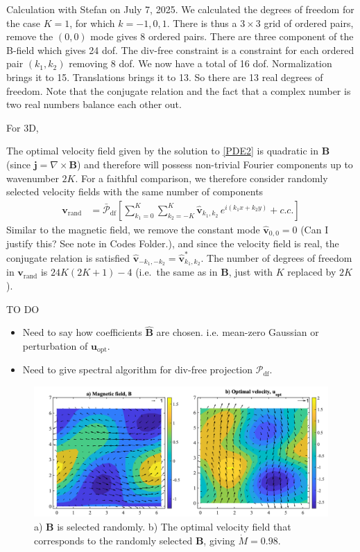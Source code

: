 \documentclass[onecolumn,showpacs,preprintnumbers,amsmath,amssymb]{revtex4-2}
\newcommand{\nick}[1]{{\color{orange}#1}}
\newcommand{\vsp}[1]{\vspace{#1 pc} \noindent}
\newcommand{\bvec}[1]{{\mathbf{#1}}}
\newcommand{\grad}{\nabla}
\newcommand{\uu}{\bvec{u}}
\newcommand{\uopt}{\uu_{\text{opt}}}
\newcommand{\vv}{\bvec{v}}
\newcommand{\Bvec}{\bvec{B}}
\newcommand{\jvec}{\bvec{j}}
\newcommand{\proj}{ \mathcal{P}_{\text{df}} }
\newcommand{\nproj}{ \bar{\mathcal{P}}_{\text{df}} }
\newcommand{\eikx}{e^{ i \left( k_1 x + k_2 y \right) }}
\newcommand{\vrand}{\vv_{\text{rand}}}
\begin{document}
\nick{Calculation with Stefan on July 7, 2025. We calculated the degrees of freedom for the case $K=1$, for which $k=-1,0,1$. There is thus a $3\times3$ grid of ordered pairs, remove the $(0,0)$ mode gives 8 ordered pairs. There are three component of the B-field which gives 24 dof. The div-free constraint is a constraint for each ordered pair $(k_1,k_2)$ removing 8 dof. We now have a total of 16 dof. Normalization brings it to 15. Translations brings it to 13. So there are 13 real degrees of freedom. Note that the conjugate relation and the fact that a complex number is two real numbers balance each other out.}

\nick{For 3D, }
 
The optimal velocity field given by the solution to \cref{PDE2} is quadratic in $\Bvec$ (since $\jvec = \grad \times \Bvec$) and therefore will possess non-trivial Fourier components up to wavenumber $2K$. For a faithful comparison, we therefore consider randomly selected velocity fields with the same number of components
\begin{align}
\label{vrand}
\vrand &= \nproj \left[ 
\sum_{k_1=0}^{K} \sum_{k_2=-K}^{K}
\hat{\vv}_{k_1, k_2} \, \eikx + c.c. \right]
\end{align}
Similar to the magnetic field, we remove the constant mode $\hat{\vv}_{0,0} = 0$ \nick{(Can I justify this? See note in Codes Folder.)}, and since the velocity field is real, the conjugate relation is satisfied $\hat{\vv}_{-k_1, -k_2} = \hat{\vv}_{k_1, k_2}^*$. The number of degrees of freedom in $\vrand$ is $24K(2K+1) - 4$ (i.e.~the same as in $\Bvec$, just with $K$ replaced by $2K$).

\vsp{5}
TO DO
\begin{itemize}
\item Need to say how coefficients $\hat{\Bvec}$ are chosen. i.e. mean-zero Gaussian or perturbation of $\uopt$.
\item Need to give spectral algorithm for div-free projection $\proj$.
\end{itemize}


\begin{figure}[htb]
\centering
 \includegraphics[width=.99 \linewidth]{vfields_ran_K=1.png}
 \caption{
a) $\Bvec$ is selected randomly.
b) The optimal velocity field that corresponds to the randomly selected $\Bvec$, giving $\dot{M} = 0.98$.}
\label{vfields_ran_K=1}
\end{figure}
\end{document}

